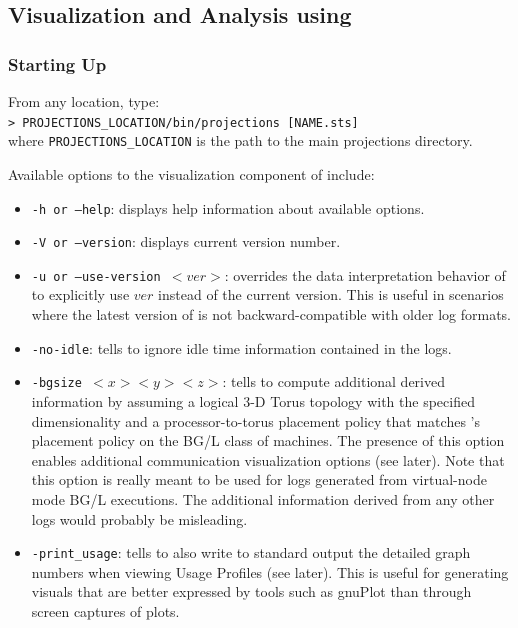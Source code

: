 \documentclass[10pt]{article}
\begin{document}
\subsection{Visualization and Analysis using \projections{}}

\subsubsection{Starting Up}
\label{sec:startingUp}
From any location, type: \\
{\tt > PROJECTIONS\_LOCATION/bin/projections [NAME.sts]} \\
where {\tt PROJECTIONS\_LOCATION} is the path to the main projections
directory.

Available options to the visualization component of \projections{} include:

\begin{itemize}
\item
{\tt -h or --help}: displays help information about available options.
\item
{\tt -V or --version}: displays current \projections{} version number.
\item
{\tt -u or --use-version $<ver>$}: overrides the data interpretation
behavior of \projections{} to explicitly use $ver$ instead of the
current version. This is useful in scenarios where the latest version
of \projections{} is not backward-compatible with older log formats.
\item
{\tt -no-idle}: tells \projections{} to ignore idle time information
contained in the logs.
\item
{\tt -bgsize $<x> <y> <z>$}: tells \projections{} to compute
additional derived information by assuming a logical 3-D Torus
topology with the specified dimensionality and a processor-to-torus
placement policy that matches \charmpp's placement policy on the BG/L
class of machines. The presence of this option enables additional
communication visualization options (see later). Note that this option
is really meant to be used for logs generated from virtual-node mode
BG/L executions. The additional information derived from any other
logs would probably be misleading.
\item
{\tt -print\_usage}: tells \projections{} to also write to standard
output the detailed graph numbers when viewing Usage Profiles (see
later). This is useful for generating visuals that are better
expressed by tools such as gnuPlot than through screen captures of
\projections{} plots.
\end{itemize}
\end{document}
